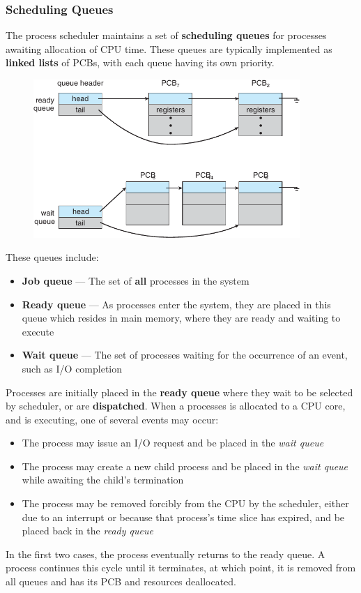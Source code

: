 \documentclass{article}
\begin{document}
\subsubsection{Scheduling Queues}
The process scheduler maintains a set of \textbf{scheduling queues} for
processes awaiting allocation of CPU time. These queues are typically
implemented as \textbf{linked lists} of PCBs, with each queue having
its own priority.
\begin{figure}[H]
    \centering
    \includegraphics[height = 6cm]{figures/scheduler_queues.pdf}
\end{figure}
These queues include:
\begin{itemize}
    \item \textbf{Job queue} --- The set of \textbf{all} processes in the system
    \item \textbf{Ready queue} --- As processes enter the system, they
          are placed in this queue which resides in main memory, where
          they are ready and waiting to execute
    \item \textbf{Wait queue} --- The set of processes waiting for the
          occurrence of an event, such as I/O completion
\end{itemize}
Processes are initially placed in the \textbf{ready queue} where they
wait to be selected by scheduler, or are \textbf{dispatched}.
When a processes is allocated to a CPU core, and is executing, one of
several events may occur:
\begin{itemize}
    \item The process may issue an I/O request and be placed in the
          \textit{wait queue}
    \item The process may create a new child process and be placed in
          the \textit{wait queue} while awaiting the child's
          termination
    \item The process may be removed forcibly from the CPU by the
          scheduler, either due to an interrupt or because that
          process's time slice has expired, and be placed back in the
          \textit{ready queue}
\end{itemize}
In the first two cases, the process eventually returns to the ready queue.
A process continues this cycle until it terminates, at which point, it
is removed from all queues and has its PCB and resources deallocated.
\end{document}
